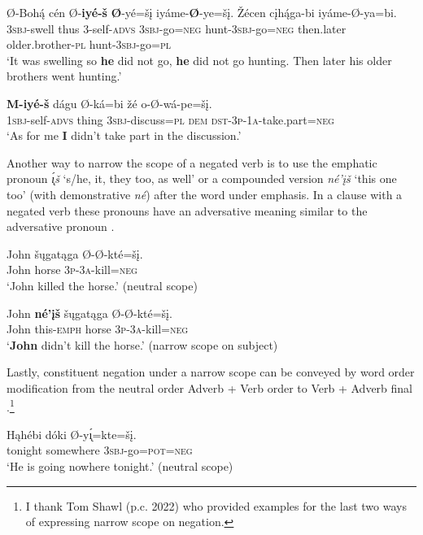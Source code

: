 \documentclass[output=paper,colorlinks,citecolor=brown]{langscibook}
\begin{document}
\ea\label{ex:nak:59}
    \gll Ø-Boh\'{ą} cén Ø-\textbf{iyé-š} \textbf{Ø}-yé=šį iyáme-\textbf{Ø}-ye=šį. Žécen cįh\'{ą}ga-bi iy\'{a}me-Ø-ya=bi. \\
         \textsc{3sbj}-swell thus \textsc{3}-self-\textsc{advs} \textsc{3sbj}-go=\textsc{neg} hunt-\textsc{3sbj}-go=\textsc{neg} then.later older.brother-\textsc{pl} hunt-\textsc{3sbj}-go=\textsc{pl} \\
    \glt ‘It was swelling so \textbf{he} did not go, \textbf{he} did not go hunting. Then later his older brothers went hunting.’ \citep[50]{Wing2002} 
\z 

\ea\label{ex:nak:60}
    \gll \textbf{M-iyé-š} dágu Ø-ká=bi žé o-Ø-wá-pe=šį. \\
         1\textsc{sbj}-self-\textsc{advs} thing \textsc{3sbj}-discuss=\textsc{pl} \textsc{dem} \textsc{dst-3p-1a}-take.part=\textsc{neg} \\
    \glt ‘As for me \textbf{I} didn’t take part in the discussion.’
\z 

Another way to narrow the scope of a negated verb is to use the emphatic pronoun \textit{\'{\k{ı}}š} ‘s/he, it, they too, as well’ or a compounded version \textit{né’įš} ‘this one too’ (with demonstrative \textit{né}) after the word under emphasis. In a clause with a negated verb these pronouns have an adversative meaning similar to the adversative pronoun .

\ea\label{ex:nak:61}
    \ea\label{ex:nak:61a}
        \gll John šųgatąga Ø-Ø-kté=šį. \\
             John horse \textsc{3p-3a}-kill=\textsc{neg} \\
        \glt ‘John killed the horse.’ (neutral scope)
    
    \ex\label{ex:nak:61b}
        \gll John \textbf{né’įš} šųgatąga Ø-Ø-kté=šį. \\
             John this-\textsc{emph} horse \textsc{3p-3a}-kill=\textsc{neg} \\
        \glt ‘\textbf{John} didn’t kill the horse.’ (narrow scope on subject)
    \z
\z

Lastly, constituent negation under a narrow scope can be conveyed by word order modification from the neutral order Adverb + Verb order  to Verb + Adverb final .\footnote{I thank Tom Shawl (p.c. 2022) who provided examples for the last two ways of expressing narrow scope on negation.}


\ea\label{ex:nak:62}
    \ea\label{ex:nak:62a}
        \gll Hąhébi dóki Ø-y\'{\k{ı}}=kte=šį. \\
             tonight somewhere \textsc{3sbj}-go=\textsc{pot=neg} \\
        \glt ‘He is going nowhere tonight.’ (neutral scope)
    
\end{document}

